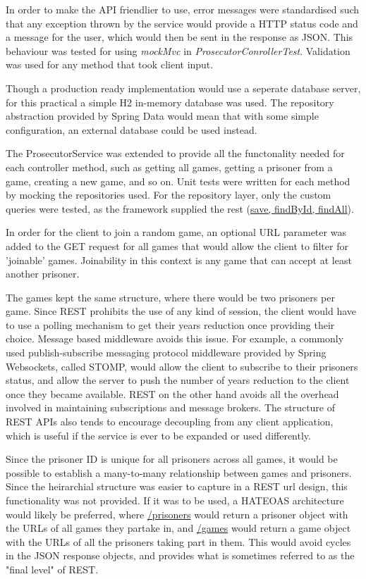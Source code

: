 \documentclass[12pt]{article}
\begin{document}
In order to make the API friendlier to use, error messages were standardised such that any exception thrown by the service would provide a HTTP status code and a message for the user, which would then be sent in the response as JSON. This behaviour was tested for using \emph{mockMvc} in \emph{ProsecutorConrollerTest}. Validation was used for any method that took client input.

Though a production ready implementation would use a seperate database server, for this practical a simple H2 in-memory database was used. The repository abstraction provided by Spring Data would mean that with some simple configuration, an external database could be used instead. 

The ProsecutorService was extended to provide all the functonality needed for each controller method, such as getting all games, getting a prisoner from a game, creating a new game, and so on. Unit tests were written for each method by mocking the repositories used. For the repository layer, only the custom queries were tested, as the framework supplied the rest (\url{save, findById, findAll}). 

In order for the client to join a random game, an optional URL parameter was added to the GET request for all games that would allow the client to filter for 'joinable' games. Joinability in this context is any game that can accept at least another prisoner.

The games kept the same structure, where there would be two prisoners per game. Since REST prohibits the use of any kind of session, the client would have to use a polling mechanism to get their years reduction once providing their choice. Message based middleware avoids this issue. For example, a commonly used publish-subscribe messaging protocol middleware provided by Spring Websockets, called STOMP, would allow the client to subscribe to their prisoners status, and allow the server to push the number of years reduction to the client once they became available. REST on the other hand avoids all the overhead involved in maintaining subscriptions and message brokers. The structure of REST APIs also tends to encourage decoupling from any client application, which is useful if the service is ever to be expanded or used differently.

Since the prisoner ID is unique for all prisoners across all games, it would be possible to establish a many-to-many relationship between games and prisoners. Since the heirarchial structure was easier to capture in a REST url design, this functionality was not provided. If it was to be used, a HATEOAS architecture would likely be preferred, where \url{/prisoners} would return a prisoner object with the URLs of all games they partake in, and \url{/games} would return a game object with the URLs of all the prisoners taking part in them. This would avoid cycles in the JSON response objects, and provides what is sometimes referred to as the "final level" of REST.
\end{document}
